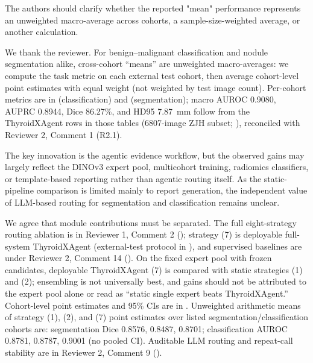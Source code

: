 \begin{reviewercomment}
The authors should clarify whether the reported "mean" performance represents an unweighted macro-average across cohorts, a sample-size-weighted average, or another calculation.
\end{reviewercomment}
\begin{authorresponse}
We thank the reviewer. For benign--malignant classification and nodule segmentation alike, cross-cohort ``means'' are unweighted macro-averages: we compute the task metric on each external test cohort, then average cohort-level point estimates with equal weight (not weighted by test image count). Per-cohort metrics are in  (classification) and  (segmentation); macro AUROC 0.9080, AUPRC 0.8944, Dice 86.27\%, and HD95 7.87~mm follow from the ThyroidXAgent rows in those tables (6807-image ZJH subset; ), reconciled with Reviewer 2, Comment 1 (R2.1).\par
\par
\end{authorresponse}

\begin{reviewercomment}
The key innovation is the agentic evidence workflow, but the observed gains may largely reflect the DINOv3 expert pool, multicohort training, radiomics classifiers, or template-based reporting rather than agentic routing itself. As the static-pipeline comparison is limited mainly to report generation, the independent value of LLM-based routing for segmentation and classification remains unclear.
\end{reviewercomment}
\begin{authorresponse}
We agree that module contributions must be separated. The full eight-strategy routing ablation is in Reviewer 1, Comment 2 (); strategy (7) is deployable full-system ThyroidXAgent (external-test protocol in ), and supervised baselines are under Reviewer 2, Comment 14 (). On the fixed expert pool with frozen candidates, deployable ThyroidXAgent (7) is compared with static strategies (1) and (2); ensembling is not universally best, and gains should not be attributed to the expert pool alone or read as ``static single expert beats ThyroidXAgent.'' Cohort-level point estimates and 95\% CIs are in . Unweighted arithmetic means of strategy (1), (2), and (7) point estimates over listed segmentation/classification cohorts are: segmentation Dice 0.8576, 0.8487, 0.8701; classification AUROC 0.8781, 0.8787, 0.9001 (no pooled CI). Auditable LLM routing and repeat-call stability are in Reviewer 2, Comment 9 ().
\par
\end{authorresponse}

